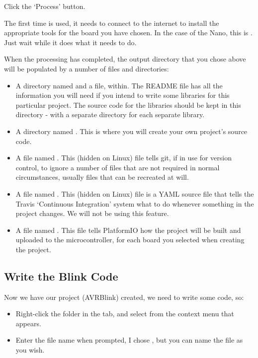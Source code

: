 Click the `Process' button.

The first time  is used, it needs to connect to the internet to install the appropriate tools for the board you have chosen. In the case of the Nano, this is . Just wait while it does what it needs to do.

When the processing has completed, the output directory that you chose
above will be populated by a number of files and directories:

\begin{itemize}
\item
  A directory named  and a file,  within.
  The README file has all the information you will need if you intend to
  write some libraries for this particular project. The source code for
  the libraries should be kept in this directory - with a separate directory for each separate library.
\item
  A directory named . This is where you will create your own
  project's source code.
\item
  A file named . This (hidden on Linux) file tells git, if in use for
  version control, to ignore a number of files that are not required in
  normal circumstances, usually files that can be recreated at will.
\item
  A file named . This (hidden on Linux) file is a YAML source file that
  tells the Travis `Continuous Integration' system what to do whenever
  something in the project changes. We will not be using this feature.
\item
  A file named . This file tells PlatformIO how the
  project will be built and uploaded to the microcontroller, for each
  board you selected when creating the project.
\end{itemize}

\subsection{Write the Blink Code}\label{write-the-blink-code}

Now we have our project (AVRBlink) created, we need to write some code, so:

\begin{itemize}
\item
  Right-click the  folder in the  tab, and select
   from the context menu that appears.
\item
  Enter the file name when prompted, I chose , but you can name
  the file as you wish.
\end{itemize}

